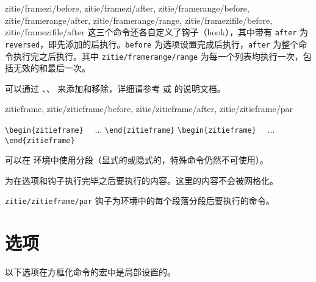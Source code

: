 \documentclass{ctxdoc}
\begin{document}
\begin{function}{
  zitie/framezi/before, zitie/framezi/after,
  zitie/framerange/before, zitie/framerange/after,
  zitie/framerange/range,
  zitie/framezifile/before, zitie/framezifile/after
}
  这三个命令还各自定义了钩子（hook），其中带有 \verb|after| 为 \verb|reversed|，即先添加的后执行。\verb|before| 为选项设置完成后执行，\verb|after| 为整个命令执行完之后执行。其中 \verb|zitie/framerange/range| 为每一个列表均执行一次，包括无效的和最后一次。

  可以通过 、、 来添加和移除，详细请参考 \cite{pdf-source2e} 或 \cite{pkg-lthooks} 的说明文档。
\end{function}

\begin{function}{zitieframe,
  zitie/zitieframe/before, zitie/zitieframe/after,
  zitie/zitieframe/par
}
  \begin{syntax}
    \verb|\begin{zitieframe}| 
    ~~...
    \verb|\end{zitieframe}|
    \verb|\begin{zitieframe}|  
    ~~...
    \verb|\end{zitieframe}|
  \end{syntax}
  可以在  环境中使用分段（显式的或隐式的，特殊命令仍然不可使用）。

   为在选项和钩子执行完毕之后要执行的内容。这里的内容不会被网格化。

  \verb|zitie/zitieframe/par| 钩子为环境中的每个段落分段后要执行的命令。
\end{function}

\section{选项}\label{sec:options}

以下选项在方框化命令的宏中是局部设置的。
\end{document}
